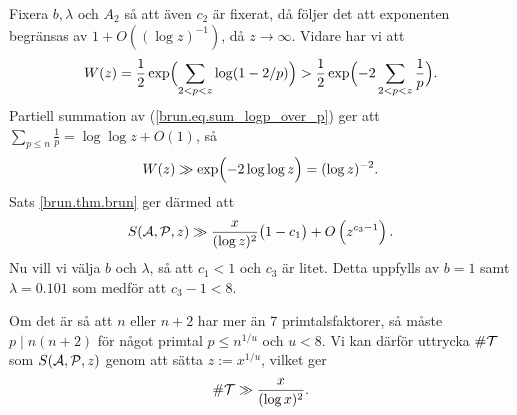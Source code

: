 Fixera $b,\lambda$ och $A_2$ så att även $c_2$ är fixerat, då följer det att exponenten begränsas av $1+O((\log z)^{-1})$, då $z\to\infty$.
Vidare har vi att 
\begin{align*}
    W(z) = \frac{1}{2}\exp\Bigl(\sum_{2<p<z} \log(1-2/p) \Bigr) 
    > \frac{1}{2}\exp\Bigl(-2\sum_{2<p<z} \frac{1}{p} \Bigr).
\end{align*}
Partiell summation av (\ref{brun.eq.sum_logp_over_p}) ger att $\sum_{p\leq n}\frac{1}{p} = \log\log z + O(1)$, så
\begin{align*}
    W(z) \gg \exp\Bigl(-2\log\log z\Bigr)
    = (\log z)^{-2}.
\end{align*}
Sats \ref{brun.thm.brun} ger därmed att
\begin{equation*}
    \S{A}{P}{z} \gg \frac{x}{(\log z)^2}\bigl(1 - c_1\bigr) + O\left(z^{c_3 - 1}\right).
\end{equation*}
Nu vill vi välja $b$ och $\lambda$, så att $c_1<1$ och $c_3$ är litet. 
Detta uppfylls av $b=1$ samt $\lambda=0.101$ som medför att $c_3-1<8$.


Om det är så att $n$ eller $n+2$ har mer än 7 primtalsfaktorer,
så måste $p\mid n(n+2)$ för något primtal $p\leq n^{1/u}$ och $u<8$.
Vi kan därför uttrycka $\card\mathcal{T}$ som $\S{A}{P}{z}$ genom att sätta $z := x^{1/u}$, vilket ger
\begin{equation*}
    \card\mathcal{T} \gg \frac{x}{(\log x)^2}.
\end{equation*}






\begin{comment}

två funktioner $g_U$ och $g_L$ som uppfyller 
\begin{alignat*}{3}
    g_U(1)&=1,\quad \text{och}&\quad \mu(d)(g_U(d)-g_U(pd)) &\geq 0, \\
    g_L(1)&=1,\quad \text{och}&\quad \mu(d)(g_L(d)-g_L(pd)) &\leq 0,
\end{alignat*}






\end{comment}